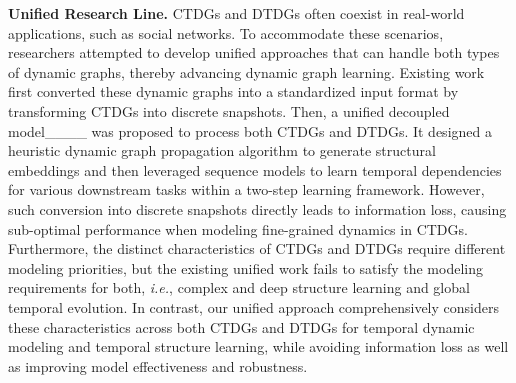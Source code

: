 




\noindent\textbf{Unified Research Line.} CTDGs and DTDGs often coexist in real-world applications, such as social networks. To accommodate these scenarios, researchers attempted to develop unified approaches that can handle both types of dynamic graphs, thereby advancing dynamic graph learning. Existing work first converted these dynamic graphs into a standardized input format by transforming CTDGs into discrete snapshots. Then, a unified decoupled model____ was proposed to process both CTDGs and DTDGs. It designed a heuristic dynamic graph propagation algorithm to generate structural embeddings and then leveraged sequence models to learn temporal dependencies for various downstream tasks within a two-step learning framework. However, such conversion into discrete snapshots directly leads to information loss, causing sub-optimal performance when modeling fine-grained dynamics in CTDGs. Furthermore, the distinct characteristics of CTDGs and DTDGs require different modeling priorities, but the existing unified work fails to satisfy the modeling requirements for both, \textit{i.e.}, complex and deep structure learning and global temporal evolution. In contrast, our unified approach comprehensively considers these characteristics across both CTDGs and DTDGs for temporal dynamic modeling and temporal structure learning, while avoiding information loss as well as improving model effectiveness and robustness.

 





